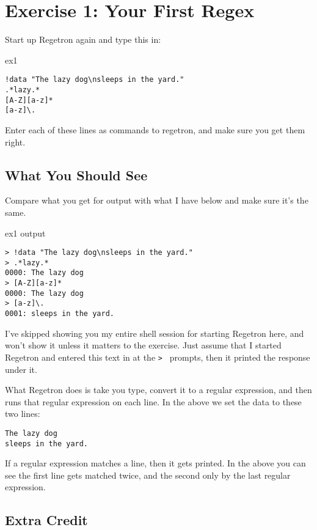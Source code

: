 \chapter{Exercise 1: Your First Regex}

Start up Regetron again and type this in:

\begin{code}{ex1}
\begin{Verbatim}
!data "The lazy dog\nsleeps in the yard."
.*lazy.*
[A-Z][a-z]*
[a-z]\.
\end{Verbatim}
\end{code}

Enter each of these lines as commands to regetron, and make sure you get
them right.

\section{What You Should See}

Compare what you get for output with what I have below and
make sure it's the same.

\begin{code}{ex1 output}
\begin{Verbatim}
> !data "The lazy dog\nsleeps in the yard."
> .*lazy.*
0000: The lazy dog
> [A-Z][a-z]*
0000: The lazy dog
> [a-z]\.
0001: sleeps in the yard.
\end{Verbatim}
\end{code}

I've skipped showing you my entire shell session for starting
Regetron here, and won't show it unless it matters to the exercise.
Just assume that I started Regetron and entered this text in at the
\verb|> | prompts, then it printed the response under it.

What Regetron does is take you type, convert it to a regular expression,
and then runs that regular expression on each line.  In the above
we set the data to these two lines:

\begin{Verbatim}
The lazy dog
sleeps in the yard.
\end{Verbatim}

If a regular expression matches a line, then it gets printed.  In the
above you can see the first line gets matched twice, and the second
only by the last regular expression.

\section{Extra Credit}

